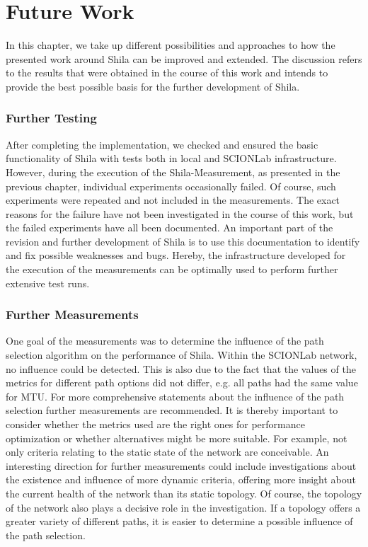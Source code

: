 \chapter{Future Work}
\label{chap:FutureWork}

In this chapter, we take up different possibilities and approaches to how the presented work around Shila can be improved and extended. The discussion refers to the results that were obtained in the course of this work and intends to provide the best possible basis for the further development of Shila.

\subsection*{Further Testing}

After completing the implementation, we checked and ensured the basic functionality of Shila with tests both in local and SCIONLab infrastructure. However, during the execution of the Shila-Measurement, as presented in the previous chapter, individual experiments occasionally failed. Of course, such experiments were repeated and not included in the measurements. The exact reasons for the failure have not been investigated in the course of this work, but the failed experiments have all been documented. An important part of the revision and further development of Shila is to use this documentation to identify and fix possible weaknesses and bugs. Hereby, the infrastructure developed for the execution of the measurements can be optimally used to perform further extensive test runs.

\subsection*{Further Measurements}

One goal of the measurements was to determine the influence of the path selection algorithm on the performance of Shila. Within the SCIONLab network, no influence could be detected. This is also due to the fact that the values of the metrics for different path options did not differ, e.g. all paths had the same value for MTU. For more comprehensive statements about the influence of the path selection further measurements are recommended. It is thereby important to consider whether the metrics used are the right ones for performance optimization or whether alternatives might be more suitable. For example, not only criteria relating to the static state of the network are conceivable. An interesting direction for further measurements could include investigations about the existence and influence of more dynamic criteria, offering more insight about the current health of the network than its static topology. Of course, the topology of the network also plays a decisive role in the investigation. If a topology offers a greater variety of different paths, it is easier to determine a possible influence of the path selection.

